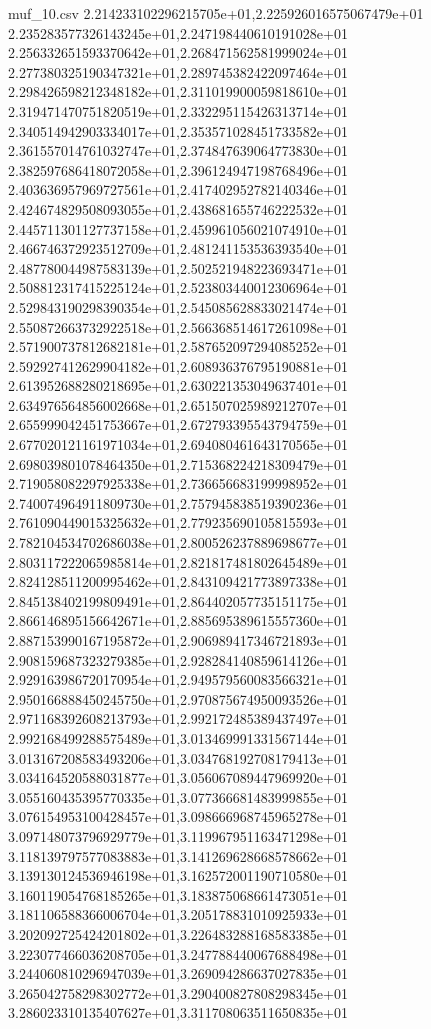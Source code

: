 \begin{filecontents*}{muf_10.csv}
2.214233102296215705e+01,2.225926016575067479e+01
2.235283577326143245e+01,2.247198440610191028e+01
2.256332651593370642e+01,2.268471562581999024e+01
2.277380325190347321e+01,2.289745382422097464e+01
2.298426598212348182e+01,2.311019900059818610e+01
2.319471470751820519e+01,2.332295115426313714e+01
2.340514942903334017e+01,2.353571028451733582e+01
2.361557014761032747e+01,2.374847639064773830e+01
2.382597686418072058e+01,2.396124947198768496e+01
2.403636957969727561e+01,2.417402952782140346e+01
2.424674829508093055e+01,2.438681655746222532e+01
2.445711301127737158e+01,2.459961056021074910e+01
2.466746372923512709e+01,2.481241153536393540e+01
2.487780044987583139e+01,2.502521948223693471e+01
2.508812317415225124e+01,2.523803440012306964e+01
2.529843190298390354e+01,2.545085628833021474e+01
2.550872663732922518e+01,2.566368514617261098e+01
2.571900737812682181e+01,2.587652097294085252e+01
2.592927412629904182e+01,2.608936376795190881e+01
2.613952688280218695e+01,2.630221353049637401e+01
2.634976564856002668e+01,2.651507025989212707e+01
2.655999042451753667e+01,2.672793395543794759e+01
2.677020121161971034e+01,2.694080461643170565e+01
2.698039801078464350e+01,2.715368224218309479e+01
2.719058082297925338e+01,2.736656683199998952e+01
2.740074964911809730e+01,2.757945838519390236e+01
2.761090449015325632e+01,2.779235690105815593e+01
2.782104534702686038e+01,2.800526237889698677e+01
2.803117222065985814e+01,2.821817481802645489e+01
2.824128511200995462e+01,2.843109421773897338e+01
2.845138402199809491e+01,2.864402057735151175e+01
2.866146895156642671e+01,2.885695389615557360e+01
2.887153990167195872e+01,2.906989417346721893e+01
2.908159687323279385e+01,2.928284140859614126e+01
2.929163986720170954e+01,2.949579560083566321e+01
2.950166888450245750e+01,2.970875674950093526e+01
2.971168392608213793e+01,2.992172485389437497e+01
2.992168499288575489e+01,3.013469991331567144e+01
3.013167208583493206e+01,3.034768192708179413e+01
3.034164520588031877e+01,3.056067089447969920e+01
3.055160435395770335e+01,3.077366681483999855e+01
3.076154953100428457e+01,3.098666968745965278e+01
3.097148073796929779e+01,3.119967951163471298e+01
3.118139797577083883e+01,3.141269628668578662e+01
3.139130124536946198e+01,3.162572001190710580e+01
3.160119054768185265e+01,3.183875068661473051e+01
3.181106588366006704e+01,3.205178831010925933e+01
3.202092725424201802e+01,3.226483288168583385e+01
3.223077466036208705e+01,3.247788440067688498e+01
3.244060810296947039e+01,3.269094286637027835e+01
3.265042758298302772e+01,3.290400827808298345e+01
3.286023310135407627e+01,3.311708063511650835e+01

\end{filecontents*}
